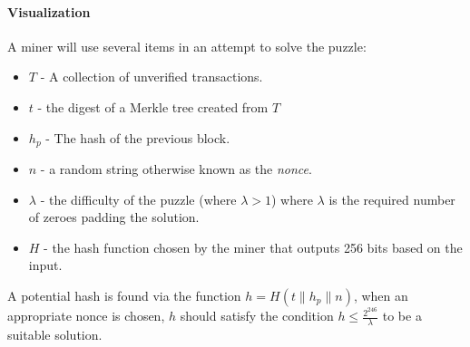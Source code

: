 \paragraph{Visualization}

\newpage{}

A miner will use several items in an attempt to solve the puzzle:

\begin{itemize}
  \item $T$ - A collection of unverified transactions.
  \item $t$ - the digest of a Merkle tree created from $T$
  \item $h_p$ - The hash of the previous block.
  \item $n$ - a random string otherwise known as the \textit{nonce}.
  \item $\lambda$ - the difficulty of the puzzle (where $\lambda > 1$) where $\lambda$ is the required number of zeroes padding the solution.
  \item $H$ - the hash function chosen by the miner that outputs 256 bits based on the input.
\end{itemize}
A potential hash is found via the function $h = H(t \| h_p \| n)$, when an appropriate nonce is chosen, $h$ should satisfy the condition $h \leq \frac{2^{246}}{\lambda}$ to be a suitable solution.
